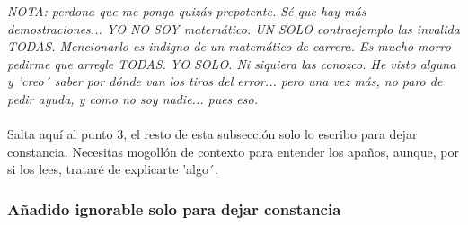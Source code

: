 	\noindent
	\textit{NOTA: perdona que me ponga quizás prepotente. Sé que hay más demostraciones... YO NO SOY matemático. UN SOLO contraejemplo las invalida TODAS. Mencionarlo es indigno de un matemático de carrera. Es mucho morro pedirme que arregle TODAS. YO SOLO. Ni siquiera las conozco. He visto alguna y 'creo´ saber por dónde van los tiros del error... pero una vez más, no paro de pedir ayuda, y como no soy nadie... pues eso.}\\\\
	
	\noindent
	Salta aquí al punto 3, el resto de esta subsección solo lo escribo para dejar constancia. Necesitas mogollón de contexto para entender los apaños, aunque, por si los lees, trataré de explicarte 'algo´.
	
	\subsubsection{Añadido ignorable solo para dejar constancia}
	
